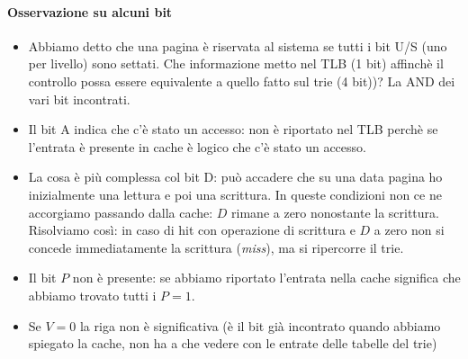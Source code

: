 \paragraph{Osservazione su alcuni bit} 
\begin{itemize}
	\item Abbiamo detto che una pagina è riservata al sistema se tutti i bit U/S (uno per livello) sono settati. Che informazione metto nel TLB (1 bit) affinchè il controllo possa essere equivalente a quello fatto sul trie (4 bit))?
	La AND dei vari bit incontrati.
	\item Il bit A indica che c'è stato un accesso: non è riportato nel TLB perchè se l'entrata è presente in cache è logico che c'è stato un accesso.
	\item La cosa è più complessa col bit D: può accadere che su una data pagina ho inizialmente una lettura e poi una scrittura. In queste condizioni non ce ne accorgiamo passando dalla cache: $D$ rimane a zero nonostante la scrittura. {Risolviamo così: in caso di hit con operazione di scrittura e $D$ a zero non si concede immediatamente la scrittura (\emph{miss}), ma si ripercorre il trie}.   
	\item Il bit $P$ non è presente: se abbiamo riportato l'entrata nella cache significa che abbiamo trovato tutti i $P=1$.
	\item Se $V=0$ la riga non è significativa (è il bit già incontrato quando abbiamo spiegato la cache, non ha a che vedere con le entrate delle tabelle del trie)
\end{itemize}
